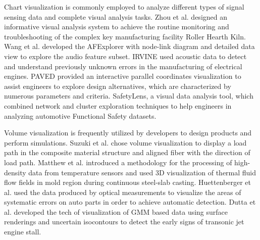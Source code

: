 \documentclass[a4paper,fleqn]{cas-dc}
\begin{document}
Chart visualization is commonly employed to analyze different types of signal sensing data and complete visual analysis tasks.
Zhou et al. \cite{Zhou2018} designed an informative visual analysis system to achieve the routine monitoring and troubleshooting of the complex key manufacturing facility Roller Hearth Kiln.
Wang et al. \cite{Wang2022} developed the AFExplorer with node-link diagram and detailed data view to explore the audio feature subset.
IRVINE \cite{eirich2021irvine} used acoustic data to detect and understand previously unknown errors in the manufacturing of electrical engines.
PAVED \cite{cibulski2020paved} provided an interactive parallel coordinates visualization to assist engineers to explore design alternatives, which are characterized by numerous parameters and criteria.
SafetyLens, \cite{narechania2020safetylens}a visual data analysis tool, which combined network and cluster exploration techniques to help engineers in analyzing automotive Functional Safety datasets.

Volume visualization is frequently utilized by developers to design products and perform simulations.
Suzuki et al. \cite{Suzuki2020} chose volume visualization to display a load path in the composite material structure and aligned fiber with the direction of load path.
Matthew et al. \cite{Zappulla2019} introduced a methodology for the processing of high-density data from temperature sensors and used 3D visualization of thermal fluid flow fields in mold region during continuous steel-slab casting.
Huettenberger et al. \cite{Huettenberger2015} used the data produced by optical measurements to visualize the areas of systematic errors on auto parts in order to achieve automatic detection.
Dutta et al. \cite{dutta2016situ} developed the tech of visualization of GMM based data using surface renderings and uncertain isocontours to detect the early signs of transonic jet engine stall.
\end{document}
